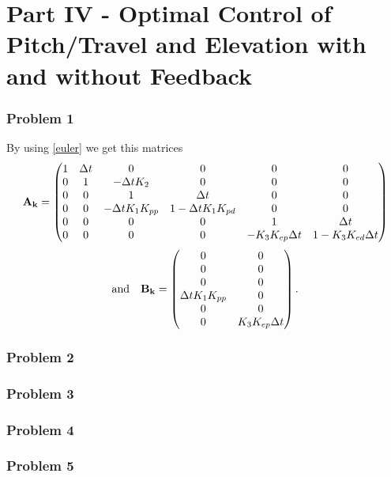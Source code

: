 \documentclass[12pt, a4paper]{article}%
\begin{document}
\section{Part IV - Optimal Control of Pitch/Travel and Elevation with and without Feedback}

\subsubsection*{Problem 1}
By using \eqref{euler} we get this matrices
\begin{equation}
\bold{A_k} =
\begin{pmatrix}
1 & \Delta{t} & 0 & 0 & 0 & 0 \\
0 & 1 & -\Delta{t}K_2 & 0 & 0 & 0 \\
0 & 0 & 1 & \Delta{t} & 0 & 0 \\
0 & 0 & -\Delta{t}K_1K_{pp} & 1 - \Delta{t}K_1K_{pd} & 0 & 0 \\
0 & 0 & 0 & 0 & 1 & \Delta{t} \\
0 & 0 & 0 & 0 & - K_3K_{ep}\Delta{t} & 1 - K_3K_{ed}\Delta{t}
\end{pmatrix}
\end{equation}
\begin{equation}
\mathrm{and}
\quad
\bold{B_k} =
\begin{pmatrix}
0 & 0 \\
0 & 0 \\
0 & 0 \\
\Delta{t}K_1K_{pp} & 0 \\
0 & 0 \\
0 & K_3K_{ep}\Delta{t}
\end{pmatrix}.
\label{matrices}
\end{equation}




\subsubsection*{Problem 2}
\subsubsection*{Problem 3}
\subsubsection*{Problem 4}
\subsubsection*{Problem 5}
\end{document}
